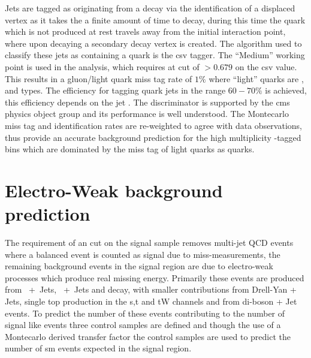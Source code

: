 Jets are tagged as originating from a \Pbottom decay via the identification of a displaced vertex as it takes the \Pbottom a finite amount of time to decay, during this time the quark which is not produced at rest travels away from the initial interaction point, where upon decaying a secondary decay vertex is created. The algorithm used to classify these jets as containing a \Pbottom quark is the \ac{csv} tagger. The ``Medium'' working point is used in the analysis, which requires at cut of $>0.679$ on the \ac{csv} value. This results in a gluon/light quark miss tag rate of $1\%$ where ``light'' quarks are \Pup, \Pdown and \Pstrange types. The efficiency for tagging \Pbottom quark jets in the range $60-70\%$\cite{ref-b-tag-eff} is achieved, this efficiency depends on the jet \PT. The discriminator is supported by the \ac{cms} \Pbottom physics object group\cite{ref-b-pog-algo} and its performance is well understood. The Montecarlo miss tag and identification rates are re-weighted to agree with data observations, thus provide an accurate background prediction for the high multiplicity \Pbottom-tagged bins which are dominated by the miss tag of light quarks as \Pbottom quarks.




\clearpage
\section{Electro-Weak background prediction} %
\label{sec:electro_weak_background_prediction}
The requirement of an \alt cut on the signal sample removes multi-jet QCD 
events where a balanced event is counted as signal due to miss-measurements, 
the remaining background events in the signal region are due to electro-weak 
processes which produce real missing energy. Primarily these events are 
produced from \HepProcess{\PZ\to\Pnu\APnu}~+~Jets, 
\HepProcess{\PW\to\Pl\APnu}~+~Jets and \HepProcess{\Ptop\APtop} decay, with 
smaller contributions from Drell-Yan + Jets, single top production in the s,t 
and tW channels and from di-boson + Jet events. To predict the number of these 
events contributing to the number of signal like events three control samples 
are defined and though the use of a Montecarlo derived transfer factor the 
control samples are used to predict the number of \ac{sm} events expected in 
the signal region.


